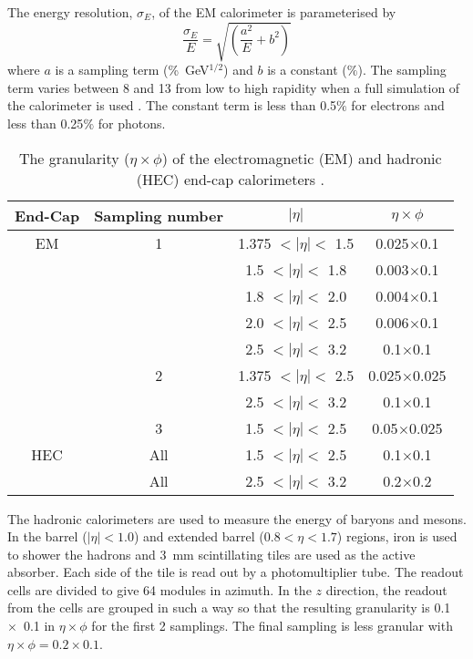 The energy resolution, $\sigma_E$, of the EM calorimeter is parameterised  by
\begin{equation}\label{Ecalres}
\frac{\sigma_E}{E}=\sqrt{\left( \frac{a^2}{E} + b^2\right)}
\end{equation}
where 
$a$ is a sampling term (\%~GeV$^{1/2}$) and $b$ is a constant  ($\%$). The  sampling term varies between 8 and 13 from low to high rapidity when a full simulation of the calorimeter is used \cite{:1999fq:Chapter4}. The constant term is less than 0.5$\%$ for electrons and less than 0.25$\%$ for photons.

\begin{table}[htdp]
\begin{center}
\begin{tabular}{|c|c|c|c|}
\hline
End-Cap & Sampling number & $|\eta|$ & $\eta\times\phi$ \\
\hline
EM & 1 & 1.375 $< |\eta| <$ 1.5 & 0.025$\times$0.1\\
 & & 1.5 $< |\eta| <$ 1.8 & 0.003$\times$0.1 \\
 & & 1.8 $< |\eta| <$ 2.0 & 0.004$\times$0.1\\
 & & 2.0 $< |\eta| <$ 2.5 & 0.006$\times$0.1\\
 & & 2.5 $< |\eta| <$ 3.2 & 0.1$\times$0.1\\
 & 2 & 1.375 $< |\eta| <$ 2.5 & 0.025$\times$0.025\\
 & & 2.5 $< |\eta| <$ 3.2 & 0.1$\times$0.1\\
 & 3 & 1.5 $< |\eta| <$ 2.5 & 0.05$\times$0.025\\
 \hline
HEC & All & 1.5 $< |\eta| <$ 2.5 & 0.1$\times$0.1\\
 & All & 2.5 $< |\eta| <$ 3.2 & 0.2$\times$0.2\\
\hline
\end{tabular}
\end{center}
\caption[The granularity ($\eta\times\phi$) of the end-cap calorimeters]{The granularity ($\eta\times\phi$) of the electromagnetic (EM) and hadronic (HEC) end-cap calorimeters \cite{:1999fq:Chapter1}.}
\label{EMendcap}
\end{table}%

%
%

The hadronic calorimeters are used to measure the energy of baryons and mesons. 
In the barrel ($|\eta|<1.0$) and extended barrel ($0.8<\eta<1.7$) regions, iron is used to shower the hadrons and 3~mm scintillating tiles are used as the active absorber. Each side of the tile is read out by a photomultiplier tube. The readout cells are divided to give 64 modules in azimuth. In the $z$ direction, the readout from the cells are grouped in such a way so that the resulting granularity is 0.1~$\times$~0.1 in $\eta\times\phi$ for the first 2 samplings. The final sampling is less granular with $\eta\times\phi = 0.2\times0.1$.


